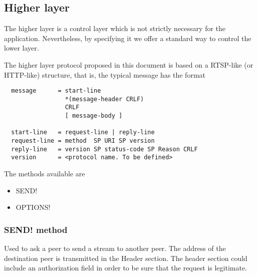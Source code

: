 \documentclass{article}
\begin{document}
\subsection{Higher layer}
\label{sub:2.1;transport_layer}

The higher layer is a control layer which is not strictly necessary
for the application.  Nevertheless, by specifying it we offer a
standard way to control the lower layer.

The higher layer protocol proposed in this document is based on a
RTSP-like (or HTTP-like) structure, that is, the typical message has
the format

\begin{verbatim}
  message      = start-line 
                 *(message-header CRLF)
                 CRLF
                 [ message-body ]

  start-line   = request-line | reply-line
  request-line = method  SP URI SP version
  reply-line   = version SP status-code SP Reason CRLF
  version      = <protocol name. To be defined>
\end{verbatim}

The methods available are

\begin{itemize}
  \item \ttt SEND!
  \item \ttt OPTIONS!
\end{itemize}

\subsubsection{\ttt SEND! method}
\label{subsub:2.1.0;transport_layer}

Used to ask a peer to send a stream to another peer.  The address of
the destination peer is transmitted in the Header section. The header
section could include an authorization field in order to be sure that
the request is legitimate.  
\end{document}
